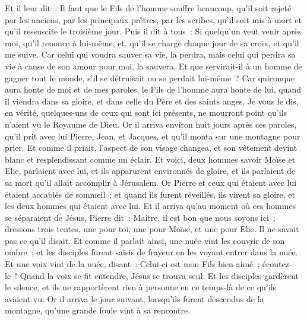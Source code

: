 \begin{multicols}{2}
Et il leur dit~: Il faut que le Fils de l'homme souffre beaucoup, qu'il soit rejeté par les anciens, par les principaux prêtres, par les scribes, qu'il soit mis à mort et qu'il ressuscite le troisième jour.
Puis il dit à tous~: Si quelqu'un veut venir après moi, qu'il renonce à lui-même, et, qu'il se charge chaque jour de sa croix, et qu'il me suive.
Car celui qui voudra sauver sa vie, la perdra, mais celui qui perdra sa vie à cause de son amour pour moi, la sauvera.
Et que servirait-il à un homme de gagner tout le monde, s'il se détruisait ou se perdait lui-même~?
Car quiconque aura honte de moi et de mes paroles, le Fils de l'homme aura honte de lui, quand il viendra dans sa gloire, et dans celle du Père et des saints anges.
Je vous le dis, en vérité, quelques-uns de ceux qui sont ici présents, ne mourront point qu'ils n'aient vu le Royaume de Dieu.
Or il arriva environ huit jours après ces paroles, qu'il prit avec lui Pierre, Jean, et Jacques, et qu'il monta sur une montagne pour prier.
Et comme il priait, l'aspect de son visage changea, et son vêtement devint blanc et resplendissant comme un éclair.
Et voici, deux hommes savoir Moïse et Elie, parlaient avec lui,
et ils apparurent environnés de gloire, et ils parlaient de sa mort qu'il allait accomplir à Jérusalem.
Or Pierre et ceux qui étaient avec lui étaient accablés de sommeil~; et quand ils furent réveillés, ils virent sa gloire, et les deux hommes qui étaient avec lui.
Et il arriva qu'au moment où ces hommes se séparaient de Jésus, Pierre dit~: Maître, il est bon que nous soyons ici~; dressons trois tentes, une pour toi, une pour Moïse, et une pour Elie. Il ne savait pas ce qu'il disait.
Et comme il parlait ainsi, une nuée vint les couvrir de son ombre~; et les disciples furent saisis de frayeur en les voyant entrer dans la nuée.
Et une voix vint de la nuée, disant~: Celui-ci est mon Fils bien-aimé~; écoutez-le~!
Quand la voix se fit entendre, Jésus se trouva seul. Et les disciples gardèrent le silence, et ils ne rapportèrent rien à personne en ce temps-là de ce qu'ils avaient vu.
Or il arriva le jour suivant, lorsqu'ils furent descendus de la montagne, qu'une grande foule vint à sa rencontre.

\end{multicols}
